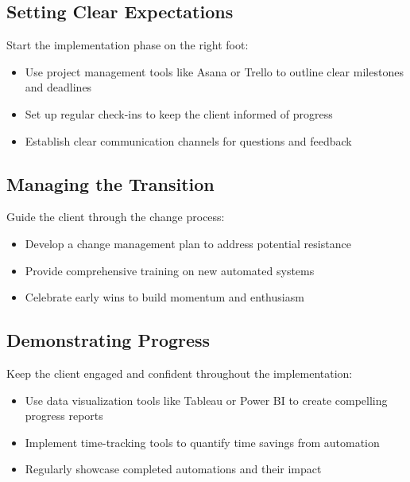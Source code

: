 \subsection{Setting Clear Expectations}

Start the implementation phase on the right foot:

\begin{itemize}
    \item Use project management tools like Asana or Trello to outline clear milestones and deadlines
    \item Set up regular check-ins to keep the client informed of progress
    \item Establish clear communication channels for questions and feedback
\end{itemize}

\subsection{Managing the Transition}

Guide the client through the change process:

\begin{itemize}
    \item Develop a change management plan to address potential resistance
    \item Provide comprehensive training on new automated systems
    \item Celebrate early wins to build momentum and enthusiasm
\end{itemize}

\subsection{Demonstrating Progress}

Keep the client engaged and confident throughout the implementation:

\begin{itemize}
    \item Use data visualization tools like Tableau or Power BI to create compelling progress reports
    \item Implement time-tracking tools to quantify time savings from automation
    \item Regularly showcase completed automations and their impact
\end{itemize}



